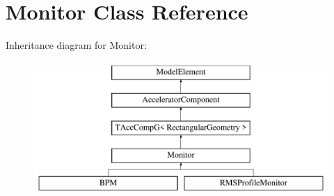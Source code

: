 \hypertarget{classMonitor}{}\section{Monitor Class Reference}
\label{classMonitor}
Inheritance diagram for Monitor\+:\begin{figure}[H]
\begin{center}
\leavevmode
\includegraphics[height=5.000000cm]{classMonitor}
\end{center}
\end{figure}
